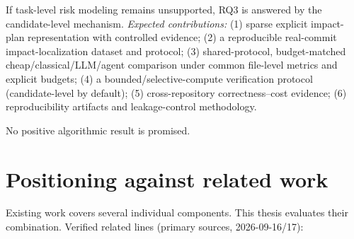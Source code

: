 \documentclass[11pt,a4paper]{article}
\begin{document}
If task-level risk modeling remains unsupported, RQ3 is answered by the
candidate-level mechanism. \emph{Expected contributions:}
(1) sparse explicit impact-plan representation with controlled evidence;
(2) a reproducible real-commit impact-localization dataset and protocol;
(3) shared-protocol, budget-matched cheap/classical/LLM/agent comparison under
common file-level metrics and explicit budgets;
(4) a bounded/selective-compute verification protocol (candidate-level by
default);
(5) cross-repository correctness--cost evidence;
(6) reproducibility artifacts and leakage-control methodology.

No positive algorithmic result is promised.

\section{Positioning against related work}
\label{sec:related}

Existing work covers several individual components. This thesis evaluates their
combination. Verified related lines (primary sources, 2026-09-16/17):
\end{document}
